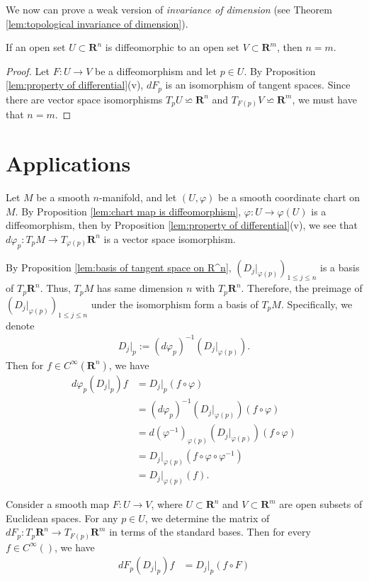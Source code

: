 We now can prove a weak version of \emph{invariance of dimension} (see Theorem \ref{lem:topological invariance of dimension}).

\begin{corollary}
    If an open set $U \subset \mathbf{R}^n$ is diffeomorphic to an open set $V \subset \mathbf{R}^m$, then $n = m$.
\end{corollary}

\begin{proof}
    Let $F : U \to V$ be a diffeomorphism and let $p \in U$. By Proposition \ref{lem:property of differential}(v), $dF_p$ is an isomorphism of tangent spaces. Since there are vector space isomorphisms $T_pU \backsimeq \mathbf{R}^n$ and $T_{F(p)}V \backsimeq \mathbf{R}^m$, we must have that $n = m$.
\end{proof}

\section{Applications}

Let $M$ be a smooth $n$-manifold, and let $(U, \varphi)$ be a smooth coordinate chart on $M$. By Proposition \ref{lem:chart map is diffeomorphism}, $\varphi : U \to \varphi(U)$ is a diffeomorphism, then by Proposition \ref{lem:property of differential}(v), we see that $d\varphi_p : T_pM \to T_{\varphi(p)}\mathbf{R}^n$ is a vector space isomorphism.

By Proposition \ref{lem:basis of tangent space on R^n}, $(D_{j}|_{\varphi(p)})_{1 \leq j \leq n}$ is a basis of $T_p\mathbf{R}^n$. Thus, $T_pM$ has same dimension $n$ with $T_p\mathbf{R}^n$. Therefore, the preimage of $(D_{j}|_{\varphi(p)})_{1 \leq j \leq n}$ under the isomorphism form a basis of $T_pM$. Specifically, we denote
    \begin{align*}
        D_{j}|_p := (d\varphi_p)^{-1}(D_{j}|_{\varphi(p)}).
    \end{align*}
Then for $f \in C^\infty(\mathbf{R}^n)$, we have
    \begin{align*}
        d\varphi_{p}(D_{j}|_p)f
        &= D_{j}|_p(f \circ \varphi)\\
        &= (d\varphi_p)^{-1}(D_{j}|_{\varphi(p)})(f \circ \varphi)\\
        &= d(\varphi^{-1})_{\varphi(p)}(D_{j}|_{\varphi(p)})(f \circ \varphi)\\
        &= D_{j}|_{\varphi(p)}(f \circ \varphi \circ \varphi^{-1})\\
        &= D_{j}|_{\varphi(p)}(f).
    \end{align*}


Consider a smooth map $F : U \to V$, where $U \subset \mathbf{R}^n$ and $V \subset \mathbf{R}^m$ are open subsets of Euclidean spaces. For any $p \in U$, we determine the matrix of $dF_p : T_p\mathbf{R}^n \to T_{F(p)}\mathbf{R}^m$ in terms of the standard bases. Then for every $f \in C^\infty()$, we have
    \begin{align*}
        dF_p(D_j|_p)f
        &= D_j|_p(f \circ F)
    \end{align*}




